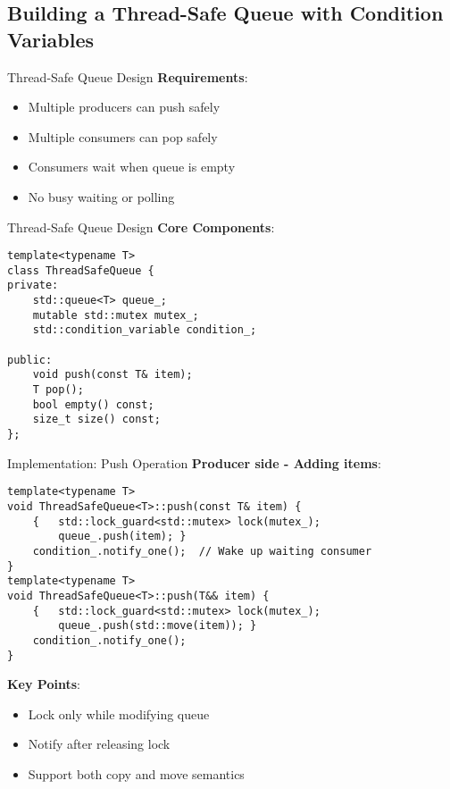 \subsection{Building a Thread-Safe Queue with Condition Variables}
\begin{frame}[fragile]{Thread-Safe Queue Design}
	\textbf{Requirements}:
	\begin{itemize}
		\item Multiple producers can push safely
		\item Multiple consumers can pop safely
		\item Consumers wait when queue is empty
		\item No busy waiting or polling
	\end{itemize}
\end{frame}

\begin{frame}[fragile]{Thread-Safe Queue Design}
	\textbf{Core Components}:
	\begin{verbatim}
template<typename T>
class ThreadSafeQueue {
private:
    std::queue<T> queue_;
    mutable std::mutex mutex_;
    std::condition_variable condition_;

public:
    void push(const T& item);
    T pop();
    bool empty() const;
    size_t size() const;
};
	\end{verbatim}
\end{frame}

\begin{frame}[fragile]{Implementation: Push Operation}
	\textbf{Producer side - Adding items}:

	\begin{verbatim}
template<typename T>
void ThreadSafeQueue<T>::push(const T& item) {
    {   std::lock_guard<std::mutex> lock(mutex_);
        queue_.push(item); }
    condition_.notify_one();  // Wake up waiting consumer
}
template<typename T>
void ThreadSafeQueue<T>::push(T&& item) {
    {   std::lock_guard<std::mutex> lock(mutex_);
        queue_.push(std::move(item)); }
    condition_.notify_one();
}
	\end{verbatim}

	\textbf{Key Points}:
	\begin{itemize}
		\item Lock only while modifying queue
		\item Notify after releasing lock
		\item Support both copy and move semantics
	\end{itemize}
\end{frame}

